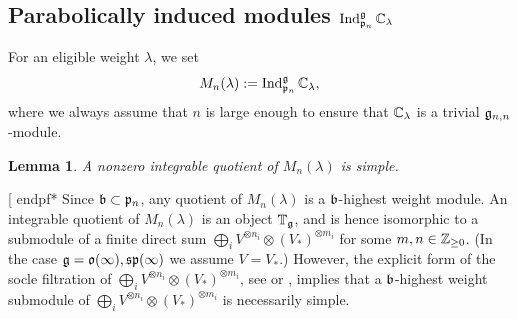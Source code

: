 \documentclass[12pt]{amsart}
\makeatletter
\def\mathbb{\Bbb}
\def\mathfrak{\frak}
\newenvironment{proof}{%
         \@ifnextchar[{%
                       \expandafter\let\expandafter\end@proof
                         \csname endpf*\endcsname
                         \my@proof
                      }{\let\end@proof\endpf\pf}%
        }{\end@proof}
\def\my@proof[#1]{\@nameuse{pf*}{#1}}
\def\@putname#1#2#3#4{\def\@@ref{#3}\let\old@bf\bf
        \def\bf##1{\old@bf\if?\noexpand##1?{#4}\else##1\fi}%
        #1{#2}%
        \let\bf\old@bf}
\def\@putname#1#2#3#4{\def\@@ref{#3}\let\old@bf\bf    %
        \let\old@reset@font\reset@font                  %
        \def\bf##1{\old@bf\if?\noexpand##1?{#4}\else##1\fi}%
        \def\reset@font##1##2{\old@reset@font##1\if?\noexpand##2?{#4}\else##2\fi}#1{#2}%
        \let\bf\old@bf\let\reset@font\old@reset@font}
\let\my@cite=\cite
\def\cite#1{\@putname\my@cite{#1}{\@citeb}{\tiny\rm\@@ref}}
\theoremstyle{plain} %
\numberwithin{equation}{section}
\theoremstyle{definition}
\theoremstyle{remark}
\theoremstyle{plain} %
\newtheorem{lemma}[definition]{Lemma}
\newcommand{\fg}{\mathfrak{g}}
\newcommand{\fp}{\mathfrak{p}}
\newcommand{\fb}{\mathfrak{b}}
\makeatother
\begin{document}
\subsection{Parabolically induced modules $\operatorname{Ind}^{\mathfrak g}_{\mathfrak p_n} \mathbb C_\lambda$ }
For an eligible weight $\lambda$, we set
$$M_n(\lambda):=\operatorname{Ind}^{\mathfrak g}_{\mathfrak p_n} \mathbb C_\lambda,$$
where we always assume that $n$ is large enough to ensure that $\mathbb C_\lambda$ is a trivial $\fg_{n,n}$-module.
\begin{lemma}\label{lem:intquo} A nonzero integrable quotient of  $M_n(\lambda)$ is  simple.
\end{lemma}
\begin{proof} Since $\fb\subset \fp_n$, any quotient of $M_n(\lambda)$ is a $\fb$-highest weight module. An integrable quotient  of $M_n(\lambda)$ is an object $\mathbb T_{\mathfrak g}$, and is hence isomorphic to a submodule of a finite direct sum $\bigoplus_{i}V^{\otimes n_i}\otimes (V_*)^{\otimes m_i} $ for some $m,n \in \mathbb{Z}_{\geq 0}$. (In the case $\fg=\mathfrak{o}(\infty), \mathfrak{sp}(\infty)$ we assume $V=V_*$.) However, the explicit form of the socle filtration of $\bigoplus_{i}V^{\otimes n_i}\otimes (V_*)^{\otimes m_i}$, see \cite{PStyr} or \cite{DPS}, implies that a $\fb$-highest weight submodule of $\bigoplus_{i}V^{\otimes n_i}\otimes (V_*)^{\otimes m_i}$ is necessarily simple.
\end{proof}
\end{document}
